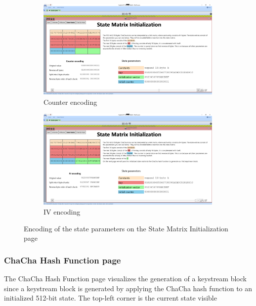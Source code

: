\begin{figure}
\begin{subfigure}{0.5\textwidth}
  \centering
  \includegraphics[width=0.99\textwidth]{figures/state-matrix/3-state-matrix-counter}
  \caption{Counter encoding}
  \label{fig:statematrix.encoding.counter}
\end{subfigure}%
\begin{subfigure}{0.5\textwidth}
  \centering
  \includegraphics[width=0.99\textwidth]{figures/state-matrix/4-state-matrix-iv}
  \caption{IV encoding}
  \label{fig:statematrix.encoding.iv}
\end{subfigure}
\caption{Encoding of the state parameters on the State Matrix Initialization page}
\label{fig:statematrix.encoding}
\end{figure}

\subsubsection{ChaCha Hash Function page}

The ChaCha Hash Function page visualizes the generation of a keystream block since a keystream block is generated by applying the ChaCha hash function to an initialized 512-bit state. The top-left corner is the current state visible

